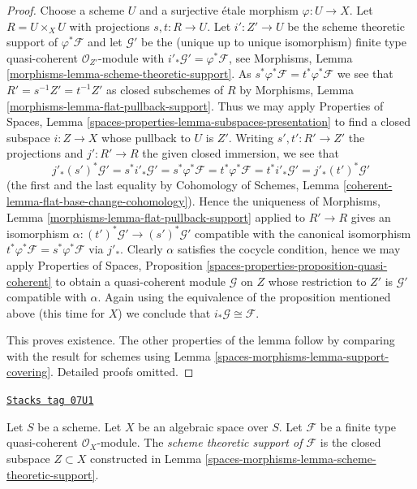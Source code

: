 \begin{proof}
Choose a scheme $U$ and a surjective \'etale morphism $\varphi : U \to X$.
Let $R = U \times_X U$ with projections $s, t : R \to U$.
Let $i' : Z' \to U$ be the scheme theoretic support of $\varphi^*\mathcal{F}$
and let $\mathcal{G}'$ be the (unique up to unique isomorphism)
finite type quasi-coherent $\mathcal{O}_{Z'}$-module
with $i'_*\mathcal{G}' = \varphi^*\mathcal{F}$, see
Morphisms, Lemma \ref{morphisms-lemma-scheme-theoretic-support}.
As $s^*\varphi^*\mathcal{F} = t^*\varphi^*\mathcal{F}$ we see that
$R' = s^{-1}Z' = t^{-1}Z'$ as closed subschemes of $R$ by
Morphisms, Lemma \ref{morphisms-lemma-flat-pullback-support}.
Thus we may apply Properties of Spaces, Lemma
\ref{spaces-properties-lemma-subspaces-presentation}
to find a closed subspace $i : Z \to X$ whose pullback to $U$ is $Z'$.
Writing $s', t' : R' \to Z'$ the projections and
$j' : R' \to R$ the given closed immersion, we see that
$$
j'_* (s')^*\mathcal{G}' = s^* i'_*\mathcal{G}' =
s^*\varphi^*\mathcal{F} = t^*\varphi^*\mathcal{F} =
t^*i'_*\mathcal{G}' = j'_*(t')^*\mathcal{G}'
$$
(the first and the last equality by Cohomology of Schemes,
Lemma \ref{coherent-lemma-flat-base-change-cohomology}).
Hence the uniqueness of
Morphisms, Lemma \ref{morphisms-lemma-flat-pullback-support}
applied to $R' \to R$ gives an isomorphism
$\alpha : (t')^*\mathcal{G}' \to (s')^*\mathcal{G}'$
compatible with the canonical isomorphism
$t^*\varphi^*\mathcal{F} = s^*\varphi^*\mathcal{F}$
via $j'_*$. Clearly $\alpha$ satisfies the cocycle condition, hence
we may apply
Properties of Spaces, Proposition
\ref{spaces-properties-proposition-quasi-coherent}
to obtain a quasi-coherent module $\mathcal{G}$ on $Z$ whose restriction
to $Z'$ is $\mathcal{G}'$ compatible with $\alpha$.
Again using the equivalence of the proposition mentioned above
(this time for $X$) we conclude that $i_*\mathcal{G} \cong \mathcal{F}$.

\medskip\noindent
This proves existence. The other properties of the lemma follow
by comparing with the result for schemes using
Lemma \ref{spaces-morphisms-lemma-support-covering}.
Detailed proofs omitted.
\end{proof}

\begin{definition}
\label{spaces-morphisms-definition-scheme-theoretic-support}
\href{https://stacks.math.columbia.edu/tag/07U1}{\texttt{Stacks tag 07U1}}

Let $S$ be a scheme. Let $X$ be an algebraic space over $S$.
Let $\mathcal{F}$ be a finite type quasi-coherent $\mathcal{O}_X$-module.
The {\it scheme theoretic support of $\mathcal{F}$} is the closed subspace
$Z \subset X$ constructed in Lemma \ref{spaces-morphisms-lemma-scheme-theoretic-support}.
\end{definition}

